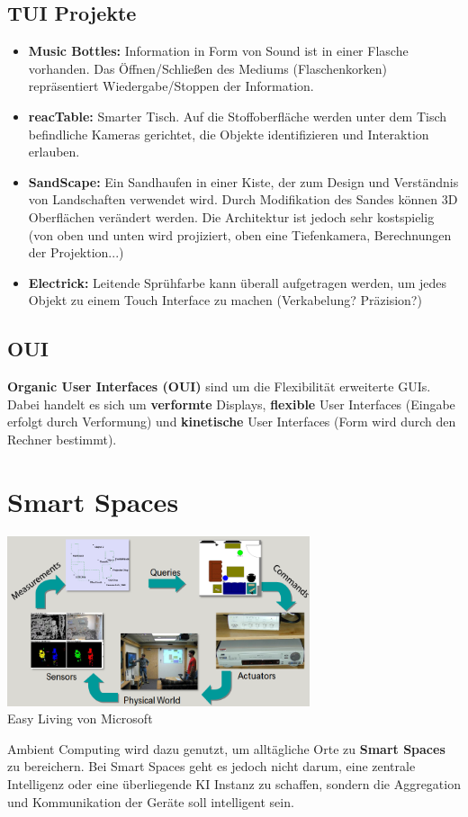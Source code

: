\documentclass[a4paper]{article}
\begin{document}
\subsection{TUI Projekte}
\begin{itemize}
	\item \textbf{Music Bottles:} Information in Form von Sound ist in einer Flasche vorhanden. Das Öffnen/Schließen des Mediums (Flaschenkorken) repräsentiert Wiedergabe/Stoppen der Information.
	\item \textbf{reacTable:} Smarter Tisch. Auf die Stoffoberfläche werden unter dem Tisch befindliche Kameras gerichtet, die Objekte identifizieren und Interaktion erlauben. 
	\item \textbf{SandScape:} Ein Sandhaufen in einer Kiste, der zum Design und Verständnis von Landschaften verwendet wird. Durch Modifikation des Sandes können 3D Oberflächen verändert werden. Die Architektur ist jedoch sehr kostspielig (von oben und unten wird projiziert, oben eine Tiefenkamera, Berechnungen der Projektion...)
	\item \textbf{Electrick:} Leitende Sprühfarbe kann überall aufgetragen werden, um jedes Objekt zu einem Touch Interface zu machen (Verkabelung? Präzision?)
\end{itemize}
\subsection{OUI}
\textbf{Organic User Interfaces (OUI)} sind um die Flexibilität erweiterte GUIs. Dabei handelt es sich um \textbf{verformte} Displays, \textbf{flexible} User Interfaces (Eingabe erfolgt durch Verformung) und \textbf{kinetische} User Interfaces (Form wird durch den Rechner bestimmt).

\newpage
\section{Smart Spaces}
\begin{center}
	\includegraphics[height = 5cm]{SmartSpace.png}\\
	Easy Living von Microsoft
\end{center}
Ambient Computing wird dazu genutzt, um alltägliche Orte zu \textbf{Smart Spaces} zu bereichern. Bei Smart Spaces geht es jedoch nicht darum, eine zentrale Intelligenz oder eine überliegende KI Instanz zu schaffen, sondern die Aggregation und Kommunikation der Geräte soll intelligent sein.
\end{document}
